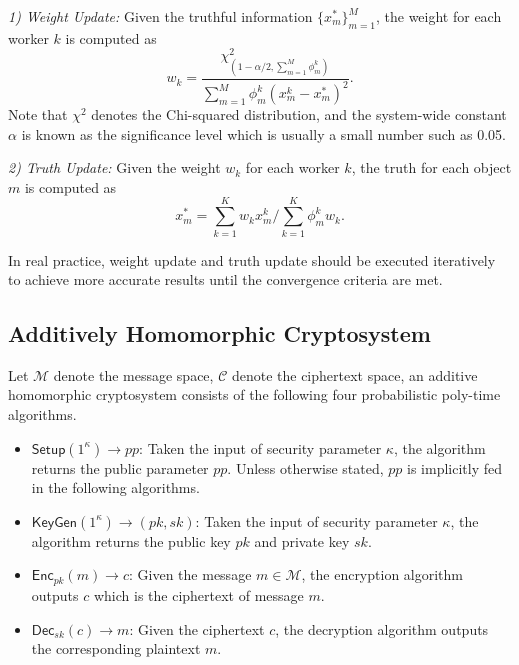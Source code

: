 \documentclass[conference]{IEEEtran}
\begin{document}
\textit{1) Weight Update:} Given the truthful information $\{x_m^*\}_{m=1}^M$, the weight for each worker $k$ is computed as
\begin{equation*}
w_k = \frac{\chi^2_{(1-\alpha/2,\sum_{m=1}^M \phi_m^k)}}{\sum\limits_{m=1}^M \phi_m^k(x_m^k - x_m^*)^2}.
\end{equation*}
Note that $\chi^2$ denotes the Chi-squared distribution, and the system-wide constant $\alpha$ is known as the significance level which is usually a small number such as 0.05.

\textit{2) Truth Update:} Given the weight $w_k$ for each worker $k$, the truth for each object $m$ is computed as
\begin{equation*}
x_m^* = \sum\limits_{k=1}^K w_k x_m^k / \sum\limits_{k=1}^K \phi_m^k w_k.
\end{equation*}

In real practice, weight update and truth update should be executed iteratively to achieve more accurate results until the convergence criteria are met.

\subsection{Additively Homomorphic Cryptosystem}\label{sec4-b}
Let $\mathcal{M}$ denote the message space, $\mathcal{C}$ denote the ciphertext space, an additive homomorphic cryptosystem consists of the following four probabilistic poly-time algorithms.

\begin{itemize}
  \item $\mathsf{Setup}(1^\kappa)\to pp$: Taken the input of security parameter $\kappa$, the algorithm returns the public parameter $pp$. Unless otherwise stated, $pp$ is implicitly fed in the following algorithms.
  \item $\mathsf{KeyGen}(1^\kappa)\to (pk, sk)$: Taken the input of security parameter $\kappa$, the algorithm returns the public key $pk$ and private key $sk$.
  \item $\mathsf{Enc}_{pk}(m)\to c$: Given the message $m\in\mathcal{M}$, the encryption algorithm outputs $c$ which is the ciphertext of message $m$.
  \item $\mathsf{Dec}_{sk}(c)\to m$: Given the ciphertext $c$, the decryption algorithm outputs the corresponding plaintext $m$.
\end{itemize}
\end{document}
